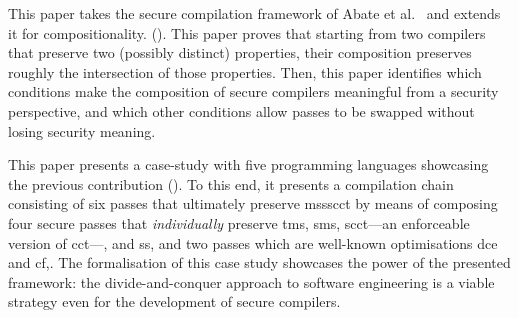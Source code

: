 \documentclass[dvipsnames,conference]{IEEEtran}
\theoremstyle{definition}
\begin{document}
\begin{asparaitem}[$\blacktriangleright$]
  \item %
        This paper takes the secure compilation framework of Abate et al.~\cite{abate2021extacc} and extends it for compositionality. ().
        This paper proves that starting from two compilers that preserve two (possibly distinct) properties, their composition preserves roughly the intersection of those properties.
        Then, this paper identifies which conditions make the composition of secure compilers meaningful from a security perspective, and which other conditions allow passes to be swapped without losing security meaning.

  \item %
        This paper presents a case-study with five programming languages showcasing the previous contribution ().
        To this end, it presents a compilation chain consisting of six passes that ultimately preserve \gls*{mssscct} by means of composing four secure passes that \emph{individually} preserve \gls*{tms}, \gls*{sms}, \gls*{scct}---an enforceable version of \gls*{cct}---, and \gls*{ss}, and two passes which are well-known optimisations \gls*{dce} and \gls*{cf},.
        The formalisation of this case study showcases the power of the presented framework: the divide-and-conquer approach to software engineering is a viable strategy even for the development of secure compilers.


\end{asparaitem}
\end{document}
